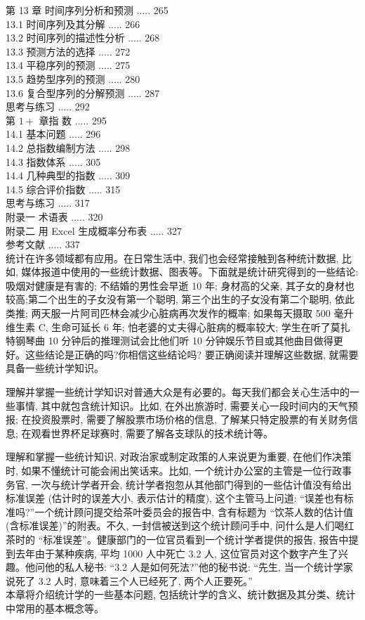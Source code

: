 \documentclass[10pt]{article}
\begin{document}
\begin{CJK*}{UTF8}{bsmi}
第 13 章 时间序列分析和预测 ..... 265\\
13.1 时间序列及其分解 ..... 266\\
13.2 时间序列的描述性分析 ..... 268\\
13.3 预测方法的选择 ..... 272\\
13.4 平稳序列的预测 ..... 275\\
13.5 趋势型序列的预测 ..... 280\\
13.6 复合型序列的分解预测 ..... 287\\
思考与练习 ..... 292\\
第 $1+$ 章指 数 ..... 295\\
14.1 基本问题 ..... 296\\
14.2 总指数编制方法 ..... 298\\
14.3 指数体系 ..... 305\\
14.4 几种典型的指数 ..... 309\\
14.5 综合评价指数 ..... 315\\
思考与练习 ..... 317\\
附录一 术语表 ..... 320\\
附录二 用 Excel 生成概率分布表 ..... 327\\
参考文献 ..... 337\\

统计在许多领域都有应用。在日常生活中, 我们也会经常接触到各种统计数据, 比如, 媒体报道中使用的一些统计数据、图表等。下面就是统计研究得到的一些结论: 吸烟对健康是有害的; 不结婚的男性会早逝 10 年; 身材高的父亲, 其子女的身材也较高;第二个出生的子女没有第一个聪明, 第三个出生的子女没有第二个聪明, 依此类推; 两天服一片阿司匹林会减少心脏病再次发作的概率; 如果每天摄取 500 毫升维生素 C, 生命可延长 6 年; 怕老婆的丈夫得心脏病的概率较大; 学生在听了莫扎特钢琴曲 10 分钟后的推理测试会比他们听 10 分钟娱乐节目或其他曲目做得更好。这些结论是正确的吗?你相信这些结论吗? 要正确阅读并理解这些数据, 就需要具备一些统计学知识。

理解并掌握一些统计学知识对普通大众是有必要的。每天我们都会关心生活中的一些事情, 其中就包含统计知识。比如, 在外出旅游时, 需要关心一段时间内的天气预报; 在投资股票时, 需要了解股票市场价格的信息, 了解某只特定股票的有关财务信息; 在观看世界杯足球赛时, 需要了解各支球队的技术统计等。

理解和掌握一些统计知识, 对政治家或制定政策的人来说更为重要, 在他们作决策时, 如果不懂统计可能会闹出笑话来。比如, 一个统计办公室的主管是一位行政事务官, 一次与统计学者开会, 统计学者抱忽从其他部门得到的一些估计值没有给出标准误差 (估计时的误差大小, 表示估计的精度), 这个主管马上问道: “误差也有标准吗?”一个统计顾问提交给茶叶委员会的报告中, 含有标题为 “饮茶人数的估计值 (含标准误差)”的附表。不久, 一封信被送到这个统计顾问手中, 问什么是人们喝红茶时的 “标准误差”。健康部门的一位官员看到一个统计学者提供的报告, 报告中提到去年由于某种疾病, 平均 1000 人中死亡 3.2 人, 这位官员对这个数字产生了兴趣。他问他的私人秘书: “3.2 人是如何死法?”他的秘书说: “先生, 当一个统计学家说死了 3.2 人时, 意味着三个人已经死了, 两个人正要死。”\\
本章将介绍统计学的一些基本问题, 包括统计学的含义、统计数据及其分类、统计中常用的基本概念等。


\end{CJK*}
\end{document}
